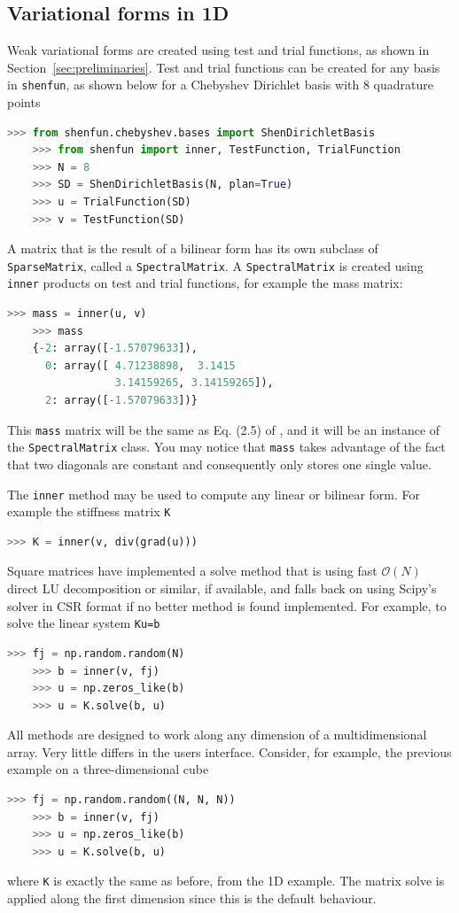 \documentclass[%
oneside,                 %
final,                   %
10pt]{article}
\theoremstyle{definition}
\begin{document}
\subsection{Variational forms in 1D}
Weak variational forms are created using test and trial functions, as shown in Section~\ref{sec:preliminaries}. Test and trial functions can be created for any basis in \texttt{shenfun}, as shown below for a Chebyshev Dirichlet basis with 8 quadrature points
\begin{lstlisting}[language=Python,style=yellow2_fb]
    >>> from shenfun.chebyshev.bases import ShenDirichletBasis
    >>> from shenfun import inner, TestFunction, TrialFunction    
    >>> N = 8
    >>> SD = ShenDirichletBasis(N, plan=True)
    >>> u = TrialFunction(SD)
    >>> v = TestFunction(SD)
\end{lstlisting}
A matrix that is the result of a bilinear form has its own subclass of \texttt{SparseMatrix}, called a \texttt{SpectralMatrix}. A \texttt{SpectralMatrix} is created using \texttt{inner} products on test and trial functions, for example the mass matrix:
\begin{lstlisting}[language=Python,style=yellow2_fb]
    >>> mass = inner(u, v)
    >>> mass
    {-2: array([-1.57079633]),
      0: array([ 4.71238898,  3.1415
                 3.14159265, 3.14159265]),
      2: array([-1.57079633])}
\end{lstlisting}
This \texttt{mass} matrix will be the same as Eq. (2.5) of \cite{shen95}, and it will be an instance of the \texttt{SpectralMatrix} class.
You may notice that \texttt{mass} takes advantage of the fact that two diagonals are constant and consequently only stores one single value.

The \texttt{inner} method may be used to compute any linear or bilinear form. For example the stiffness matrix \texttt{K}
\begin{lstlisting}[language=Python,style=yellow2_fb]
    >>> K = inner(v, div(grad(u)))
\end{lstlisting}
Square matrices have implemented a solve method that is using fast $\mathcal{O}(N)$ direct LU decomposition or similar, if available, and falls back on using Scipy's solver in CSR format if no better method is found implemented. For example, to solve the linear system \texttt{Ku=b}
\begin{lstlisting}[language=Python,style=yellow2_fb]
    >>> fj = np.random.random(N)
    >>> b = inner(v, fj)
    >>> u = np.zeros_like(b)
    >>> u = K.solve(b, u)
\end{lstlisting}
All methods are designed to work along any dimension of a multidimensional array. Very little differs in the users interface. Consider, for example, the previous example on a three-dimensional cube 
\begin{lstlisting}[language=Python,style=yellow2_fb]
    >>> fj = np.random.random((N, N, N))
    >>> b = inner(v, fj)
    >>> u = np.zeros_like(b)
    >>> u = K.solve(b, u)
\end{lstlisting}
where \texttt{K} is exactly the same as before, from the 1D example. The matrix solve is applied along the first dimension since this is the default behaviour.
\end{document}
